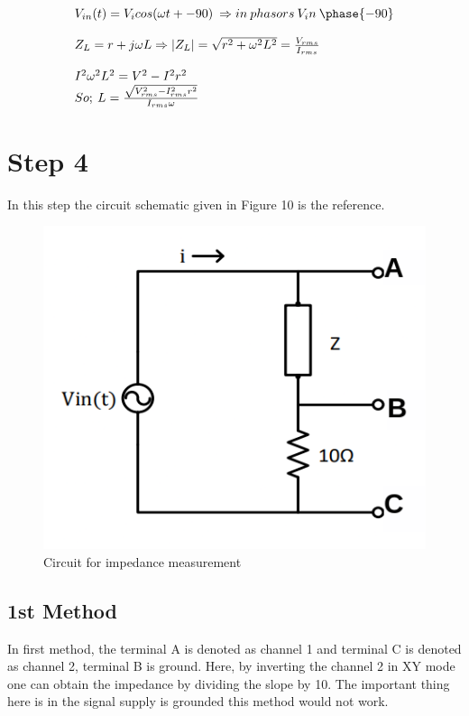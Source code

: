 \documentclass[letterpaper,12pt]{article}
\begin{document}
\begin{align*}
    \begin{array}{l}
        V_{in}(t) = V_i cos(\omega t+ -90 )  \: \Rightarrow  in \: phasors \:  V_in \: \phase {-90} \\ \\
        Z_L = r + j\omega L \Rightarrow |Z_L| = \sqrt{r^2+\omega^2 L^2} = \frac{V_{rms}}{I_{rms}} \\ \\
        I^2 \omega^2 L^2 = V^2 - I^2 r^2 \\
        So;  \: L = \frac{\sqrt{V_{rms}^2 -  I_{rms}^2 r^2}}{I_{rms} \omega}
    \end{array}
\end{align*}

\section{Step 4}
In this step the circuit schematic given in Figure 10 is the reference.
\begin{figure}[H]
    \centering
    \includegraphics[width=1\textwidth]{4.png}
\caption{Circuit for impedance measurement}
\end{figure} 
\subsection{1st Method}
In first method, the terminal A is denoted as channel 1 and terminal C is denoted as channel 2, terminal B is ground. Here, by inverting the channel 2 in XY mode one can obtain the impedance by dividing the slope by 10. The important thing here is in the signal supply is grounded this method would not work.
\end{document}
